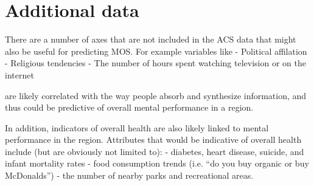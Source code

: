 \documentclass{article}
\begin{document}
    \section{Additional data}\label{additional-data}

There are a number of axes that are not included in the ACS data that
might also be useful for predicting MOS. For example variables like -
Political affilation - Religious tendencies - The number of hours spent
watching television or on the internet

are likely correlated with the way people absorb and synthesize
information, and thus could be predictive of overall mental performance
in a region.

In addition, indicators of overall health are also likely linked to
mental performance in the region. Attributes that would be indicative of
overall health include (but are obviously not limited to): - diabetes,
heart disease, suicide, and infant mortality rates - food consumption
trends (i.e. ``do you buy organic or buy McDonalds'') - the number of
nearby parks and recreational areas.


    
    
    
    
\end{document}
